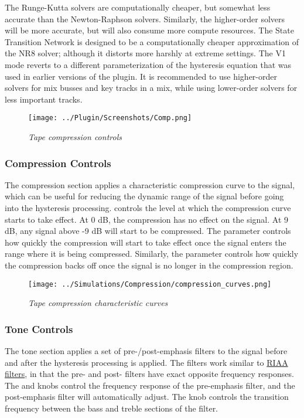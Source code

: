 \documentclass[landscape,twocolumn,a5paper]{manual}
\begin{document}
%
The Runge-Kutta solvers are computationally cheaper, but
somewhat less accurate than the Newton-Raphson solvers.
Similarly, the higher-order solvers will be more accurate,
but will also consume more compute resources. The State
Transition Network is designed to be a computationally
cheaper approximation of the NR8 solver; although it
distorts more harshly at extreme settings. The V1 mode
reverts to a different parameterization of the hysteresis
equation that was used in earlier versions of the plugin. It
is recommended to use higher-order solvers for mix busses
and key tracks in a mix, while using lower-order solvers for
less important tracks.

\begin{figure}[ht]
    \center
    \texttt{[image: ../Plugin/Screenshots/Comp.png]}
    \caption{\label{comp_controls}{\it Tape compression controls}}
\end{figure}
%
\subsubsection{Compression Controls}
The compression section applies a characteristic
compression curve to the signal, which can be useful
for reducing the dynamic range of the signal before
going into the hysteresis processing.
\newpar
{} controls the level at which the
compression curve starts to take effect. At 0 dB, the
compression has no effect on the signal. At 9 dB, any
signal above -9 dB will start to be compressed.
\newpar
The  parameter controls how quickly
the compression will start to take effect once the
signal enters the range where it is being compressed.
\newpar
Similarly, the  parameter controls
how quickly the compression backs off once the signal
is no longer in the compression region.
%
\begin{figure}[ht]
    \center
    \texttt{[image: ../Simulations/Compression/compression\_curves.png]}
    \caption{\label{comp_curves}{\it Tape compression characteristic curves}}
\end{figure}

\subsubsection{Tone Controls}
The tone section applies a set of pre-/post-emphasis filters
to the signal before and after the hysteresis processing
is applied. The filters work similar to
\href{https://en.wikipedia.org/wiki/RIAA_equalization}{RIAA filters},
in that the pre- and post- filters have exact opposite frequency
responses.
\newpar
The  and  knobs control
the frequency response of the pre-emphasis filter, and the
post-emphasis filter will automatically adjust. The
 knob controls the transition frequency
between the bass and treble sections of the filter.
\end{document}
